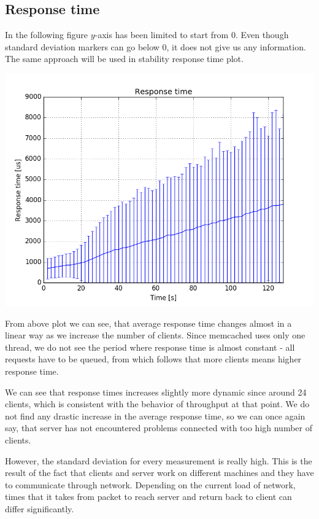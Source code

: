 \documentclass[11pt]{article}
\begin{document}
\subsection{Response time}\label{sec:baseline:rt}

In the following figure $y$-axis has been limited to start from 0. Even though standard deviation markers can go below 0, it does not give us any information. The same approach will be used in stability response time plot.

\includegraphics[scale=0.7]{baseline_response_time.png}
\medskip

From above plot we can see, that average response time changes almost in a linear way as we increase the number of clients. Since memcached uses only one thread, we do not see the period where response time is almost constant - all requests have to be queued, from which follows that more clients means higher response time.

We can see that response times increases slightly more dynamic since around 24 clients, which is consistent with the behavior of throughput at that point. We do not find any drastic increase in the average response time, so we can once again say, that server has not encountered problems connected with too high number of clients.

However, the standard deviation for every measurement is really high. This is the result of the fact that clients and server work on different machines and they have to communicate through network. Depending on the current load of network, times that it takes from packet to reach server and return back to client can differ significantly.
\end{document}
